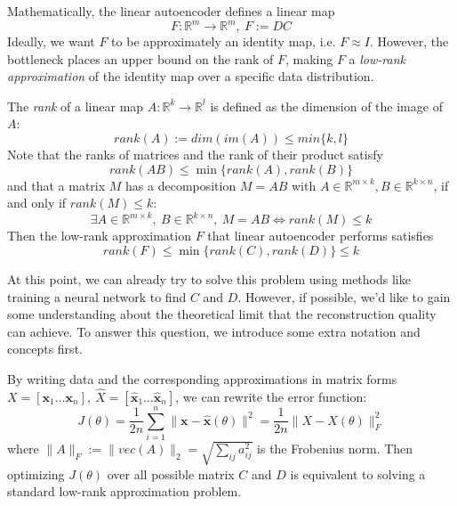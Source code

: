 \documentclass[../book-template.tex]{subfiles}
\begin{document}
\par Mathematically, the linear autoencoder defines a linear map 
\begin{equation*}
    F:\mathbb{R}^m \rightarrow \mathbb{R}^m,\ F:=DC
\end{equation*}
Ideally, we want $F$ to be approximately an identity map, i.e. $F\approx I$. However, the bottleneck places an upper bound on the rank of $F$, making $F$ a \emph{low-rank approximation} of the identity map over a specific data distribution.
\par The \emph{rank} of a linear map $A:\mathbb{R}^k\rightarrow \mathbb{R}^l$ is defined as the dimension of the image of $A$:
\begin{equation*}
    rank(A):=dim(im(A))\leq min\{k,l\}
\end{equation*}
Note that the ranks of matrices and the rank of their product satisfy
\begin{equation*}
    rank(AB)\leq \min\{rank(A), rank(B)\}
\end{equation*}
and that a matrix $M$ has a decomposition $M=AB$ with $A\in \mathbb{R}^{m\times k},B\in \mathbb{R}^{k\times n}$, if and only if $rank(M)\leq k$:
\begin{equation*}
    \exists A\in \mathbb{R}^{m\times k},\ B\in \mathbb{R}^{k\times n},\ M=AB \Longleftrightarrow rank(M)\leq k
\end{equation*}
Then the low-rank approximation $F$ that linear autoencoder performs satisfies
\begin{equation*}
    rank(F)\leq \min\{rank(C),rank(D)\}\leq k
\end{equation*}
\par At this point, we can already try to solve this problem using methods like training a neural network to find $C$ and $D$. However, if possible, we'd like to gain some understanding about the theoretical limit that the reconstruction quality can achieve. To answer this question, we introduce some extra notation and concepts first.
\par By writing data and the corresponding approximations in matrix forms $X = [\bm{x}_1\dots \bm{x}_n],\ \hat{X} = [\hat{\bm{x}}_1\dots \hat{\bm{x}}_n]$, we can rewrite the error function:
\begin{equation*}
    J(\theta)=\frac{1}{2n}\sum_{i=1}^{n}\|\bm{x}-\hat{\bm{x}}(\theta)\|^2=\frac{1}{2n}\|X-\hat{X}(\theta)\|^2_F
\end{equation*}
where $\|A\|_F:=\|vec(A)\|_2=\sqrt{\sum_{ij}a_{ij}^2}$ is the Frobenius norm. Then optimizing $J(\theta)$ over all possible matrix $C$ and $D$ is equivalent to solving a standard low-rank approximation problem.
\end{document}
